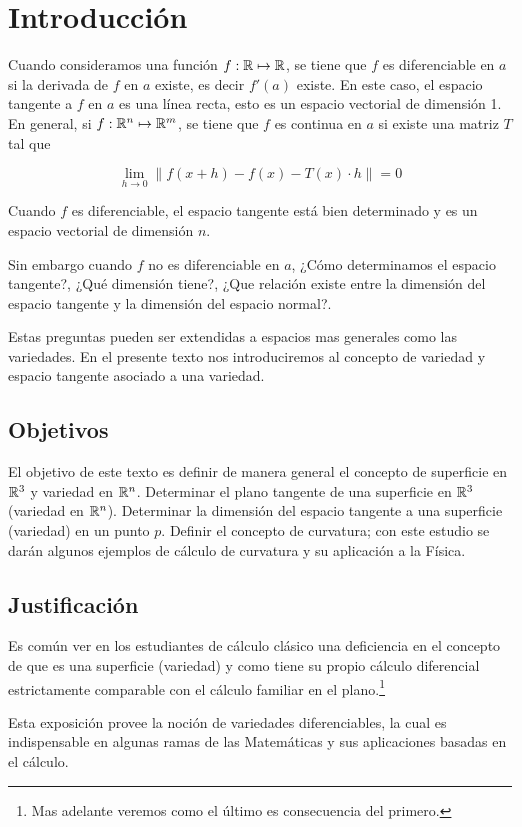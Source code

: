 \chapter{Introducción}\label{ch:introduccion}
Cuando consideramos una función $f:\mathbb{R}\mapsto\mathbb{R}$, se tiene que $f$ es diferenciable en $a$ si la derivada de $f$ en $a$ existe, es decir $f'(a)$ existe. En este caso, el espacio tangente a $f$ en $a$ es una línea recta, esto es un espacio vectorial de dimensión 1. En general, si $f:\mathbb{R}^{n}\mapsto\mathbb{R}^{m}$, se tiene que $f$ es continua en $a$ si existe una matriz $T$ tal que

    $$\lim_{h \to 0} \| f(x+h) - f(x) - T(x) \cdot h \| = 0$$

Cuando $f$ es diferenciable, el espacio tangente está bien determinado y es un espacio vectorial de dimensión $n$.

Sin embargo cuando $f$ no es diferenciable en $a$, ¿Cómo determinamos el espacio tangente?, ¿Qué dimensión tiene?, ¿Que relación existe entre la dimensión del espacio tangente y la dimensión del espacio normal?.

Estas preguntas pueden ser extendidas a espacios mas generales como las variedades.
En el presente texto nos introduciremos al concepto de variedad y espacio tangente asociado a una variedad.


\section{Objetivos}

El objetivo de este texto es definir de manera general el concepto de superficie en $\mathbb{R}^{3}$ y variedad en $\mathbb{R}^{n}$.
Determinar el plano tangente de una superficie en $\mathbb{R}^{3}$ (variedad en $\mathbb{R}^{n}$). Determinar la dimensión del espacio tangente a una superficie (variedad) en un punto $p$. Definir el concepto de curvatura; con este estudio se darán algunos ejemplos de cálculo de curvatura y su aplicación a la Física.

\section{Justificación}

Es común ver en los estudiantes de cálculo clásico una deficiencia en el concepto de que es una superficie (variedad) y como tiene su propio cálculo diferencial estrictamente comparable con el cálculo familiar en el plano.\footnote{Mas adelante veremos como el último es consecuencia del primero.}

Esta exposición provee la noción de variedades diferenciables, la cual es indispensable en algunas ramas de las Matemáticas y sus aplicaciones basadas en el cálculo.





